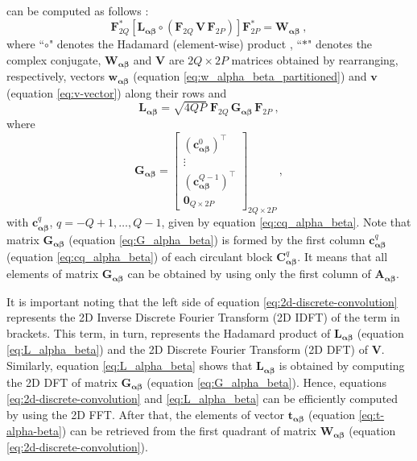 can be computed as follows \citep{takahashi2020convolutional}:
\begin{equation}
\mathbf{F}_{2Q}^{\ast} \left[ 
\mathbf{L}_{\boldsymbol{\alpha\beta}} \circ \left(\mathbf{F}_{2Q} \, \mathbf{V} \, \mathbf{F}_{2P} \right) 
\right] \mathbf{F}_{2P}^{\ast} = \mathbf{W}_{\boldsymbol{\alpha\beta}} \: ,
\label{eq:2d-discrete-convolution}
\end{equation}
where ``$\circ$" denotes the Hadamard (element-wise) product \citep[e.g.,][ p. 298]{horn_johnson1991},
``$\ast$" denotes the complex conjugate, 
$\mathbf{W}_{\boldsymbol{\alpha\beta}}$ and $\mathbf{V}$ are $2Q \times 2P$ matrices obtained
by rearranging, respectively, vectors $\mathbf{w}_{\boldsymbol{\alpha\beta}}$ 
(equation \ref{eq:w_alpha_beta_partitioned}) and $\mathbf{v}$ (equation \ref{eq:v-vector})
along their rows and
\begin{equation}
\mathbf{L}_{\boldsymbol{\alpha\beta}} = \sqrt{4QP} \; 
\mathbf{F}_{2Q} \, \mathbf{G}_{\boldsymbol{\alpha\beta}} \, \mathbf{F}_{2P} \: ,
\label{eq:L_alpha_beta}
\end{equation}
where
\begin{equation}
\mathbf{G}_{\boldsymbol{\alpha\beta}} = \begin{bmatrix}
\left( \mathbf{c}_{\boldsymbol{\alpha\beta}}^{0} \right)^{\top} \\
\vdots \\
\left( \mathbf{c}_{\boldsymbol{\alpha\beta}}^{Q-1} \right)^{\top} \\
\mathbf{0}_{Q \times 2P}
\end{bmatrix}_{2Q \times 2P} \: ,
\label{eq:G_alpha_beta}
\end{equation}
with $\mathbf{c}_{\boldsymbol{\alpha\beta}}^{q}$, $q = -Q+1, \dots, Q-1$, given by equation
\ref{eq:cq_alpha_beta}.
Note that matrix $\mathbf{G}_{\boldsymbol{\alpha\beta}}$ 
(equation \ref{eq:G_alpha_beta}) is formed by the first column 
$\mathbf{c}_{\boldsymbol{\alpha\beta}}^{q}$ (equation \ref{eq:cq_alpha_beta}) of each 
circulant block $\mathbf{C}_{\boldsymbol{\alpha\beta}}^{q}$. It means that all elements
of matrix $\mathbf{G}_{\boldsymbol{\alpha\beta}}$ can be obtained by using only the first 
column of $\mathbf{A_{\boldsymbol{\alpha\beta}}}$.

It is important noting that the left side of equation \ref{eq:2d-discrete-convolution} represents 
the 2D Inverse Discrete Fourier Transform (2D IDFT) of the term in brackets. This term, in turn,
represents the Hadamard product of $\mathbf{L}_{\boldsymbol{\alpha\beta}}$ 
(equation \ref{eq:L_alpha_beta}) and the 2D Discrete Fourier Transform (2D DFT) of $\mathbf{V}$.
Similarly, equation \ref{eq:L_alpha_beta} shows that $\mathbf{L}_{\boldsymbol{\alpha\beta}}$ is
obtained by computing the 2D DFT of matrix $\mathbf{G}_{\boldsymbol{\alpha\beta}}$
(equation \ref{eq:G_alpha_beta}). Hence, equations \ref{eq:2d-discrete-convolution} and
\ref{eq:L_alpha_beta} can be efficiently computed by using the 2D FFT. After that, the elements of
vector $\mathbf{t}_{\boldsymbol{\alpha\beta}}$ (equation \ref{eq:t-alpha-beta}) can be
retrieved from the first quadrant of matrix $\mathbf{W}_{\boldsymbol{\alpha\beta}}$
(equation \ref{eq:2d-discrete-convolution}).

